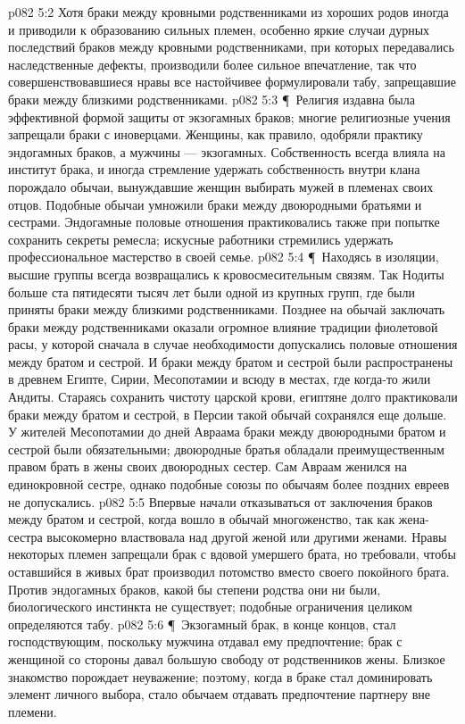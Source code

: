 \vs p082 5:2 Хотя браки между кровными родственниками из хороших родов иногда и приводили к образованию сильных племен, особенно яркие случаи дурных последствий браков между кровными родственниками, при которых передавались наследственные дефекты, производили более сильное впечатление, так что совершенствовавшиеся нравы все настойчивее формулировали табу, запрещавшие браки между близкими родственниками.
\vs p082 5:3 \P\ Религия издавна была эффективной формой защиты от экзогамных браков; многие религиозные учения запрещали браки с иноверцами. Женщины, как правило, одобряли практику эндогамных браков, а мужчины --- экзогамных. Собственность всегда влияла на институт брака, и иногда стремление удержать собственность внутри клана порождало обычаи, вынуждавшие женщин выбирать мужей в племенах своих отцов. Подобные обычаи умножили браки между двоюродными братьями и сестрами. Эндогамные половые отношения практиковались также при попытке сохранить секреты ремесла; искусные работники стремились удержать профессиональное мастерство в своей семье.
\vs p082 5:4 \P\ Находясь в изоляции, высшие группы всегда возвращались к кровосмесительным связям. Так Нодиты больше ста пятидесяти тысяч лет были одной из крупных групп, где были приняты браки между близкими родственниками. Позднее на обычай заключать браки между родственниками оказали огромное влияние традиции фиолетовой расы, у которой сначала в случае необходимости допускались половые отношения между братом и сестрой. И браки между братом и сестрой были распространены в древнем Египте, Сирии, Месопотамии и всюду в местах, где когда\hyp{}то жили Андиты. Стараясь сохранить чистоту царской крови, египтяне долго практиковали браки между братом и сестрой, в Персии такой обычай сохранялся еще дольше. У жителей Месопотамии до дней Авраама браки между двоюродными братом и сестрой были обязательными; двоюродные братья обладали преимущественным правом брать в жены своих двоюродных сестер. Сам Авраам женился на единокровной сестре, однако подобные союзы по обычаям более поздних евреев не допускались.
\vs p082 5:5 Впервые начали отказываться от заключения браков между братом и сестрой, когда вошло в обычай многоженство, так как жена\hyp{}сестра высокомерно властвовала над другой женой или другими женами. Нравы некоторых племен запрещали брак с вдовой умершего брата, но требовали, чтобы оставшийся в живых брат производил потомство вместо своего покойного брата. Против эндогамных браков, какой бы степени родства они ни были, биологического инстинкта не существует; подобные ограничения целиком определяются табу.
\vs p082 5:6 \P\ Экзогамный брак, в конце концов, стал господствующим, поскольку мужчина отдавал ему предпочтение; брак с женщиной со стороны давал большую свободу от родственников жены. Близкое знакомство порождает неуважение; поэтому, когда в браке стал доминировать элемент личного выбора, стало обычаем отдавать предпочтение партнеру вне племени.
